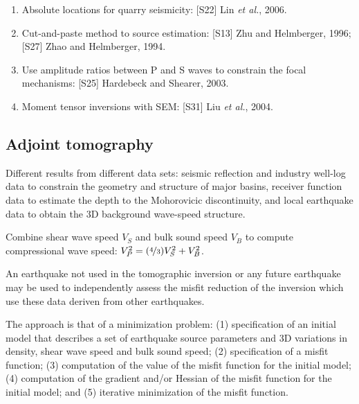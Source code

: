 \documentclass{article}
\newcommand{\etal}{\textit{et al.}}
\begin{document}
\begin{enumerate}[\hspace{10mm}*]
    \item Absolute locations for quarry seismicity: [S22] Lin \etal, 2006.
    \item Cut-and-paste method to source estimation: [S13] Zhu and Helmberger, 1996; [S27] Zhao and Helmberger, 1994.
    \item Use amplitude ratios between P and S waves to constrain the focal mechanisms: [S25] Hardebeck and Shearer, 2003.
    \item Moment tensor inversions with SEM: [S31] Liu \etal, 2004.
\end{enumerate}\par
\subsection{Adjoint tomography}
Different results from different data sets: seismic reflection and industry well-log data to constrain the geometry and structure of major basins, receiver function data to estimate the depth to the Mohorovicic discontinuity, and local earthquake data to obtain the 3D background wave-speed structure.\par
Combine shear wave speed $V_S$ and bulk sound speed $V_B$ to compute compressional wave speed: $V_P^2=(\nicefrac{4}{3})V_S^2+V_B^2$.\par
An earthquake not used in the tomographic inversion or any future earthquake may be used to independently assess the misfit reduction of the inversion which use these data deriven from other earthquakes.\par
The approach is that of a minimization problem: (1) specification of an initial model that describes a set of earthquake source parameters and 3D variations in density, shear wave speed and bulk sound speed; (2) specification of a misfit function; (3) computation of the value of the misfit function for the initial model; (4) computation of the gradient and/or Hessian of the misfit function for the initial model; and (5) iterative minimization of the misfit function.\par
\end{document}

